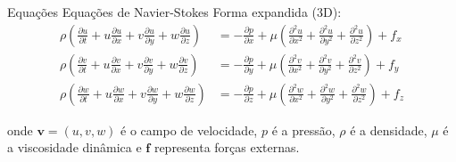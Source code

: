 \begin{frame}{Equações}
    Equações de Navier-Stokes Forma expandida (3D):
    \footnotesize
        \begin{align*}
            \rho\left(\frac{\partial u}{\partial t} + u\frac{\partial u}{\partial x} + v\frac{\partial u}{\partial y} + w\frac{\partial u}{\partial z}\right) &= -\frac{\partial p}{\partial x} + \mu\left(\frac{\partial^2 u}{\partial x^2} + \frac{\partial^2 u}{\partial y^2} + \frac{\partial^2 u}{\partial z^2}\right) + f_x \\[0.3cm]
            \rho\left(\frac{\partial v}{\partial t} + u\frac{\partial v}{\partial x} + v\frac{\partial v}{\partial y} + w\frac{\partial v}{\partial z}\right) &= -\frac{\partial p}{\partial y} + \mu\left(\frac{\partial^2 v}{\partial x^2} + \frac{\partial^2 v}{\partial y^2} + \frac{\partial^2 v}{\partial z^2}\right) + f_y \\[0.3cm]
            \rho\left(\frac{\partial w}{\partial t} + u\frac{\partial w}{\partial x} + v\frac{\partial w}{\partial y} + w\frac{\partial w}{\partial z}\right) &= -\frac{\partial p}{\partial z} + \mu\left(\frac{\partial^2 w}{\partial x^2} + \frac{\partial^2 w}{\partial y^2} + \frac{\partial^2 w}{\partial z^2}\right) + f_z
        \end{align*}
        
    onde $\mathbf{v} = (u,v,w)$ é o campo de velocidade, $p$ é a pressão, $\rho$ é a densidade, $\mu$ é a viscosidade dinâmica e $\mathbf{f}$ representa forças externas.
\end{frame}